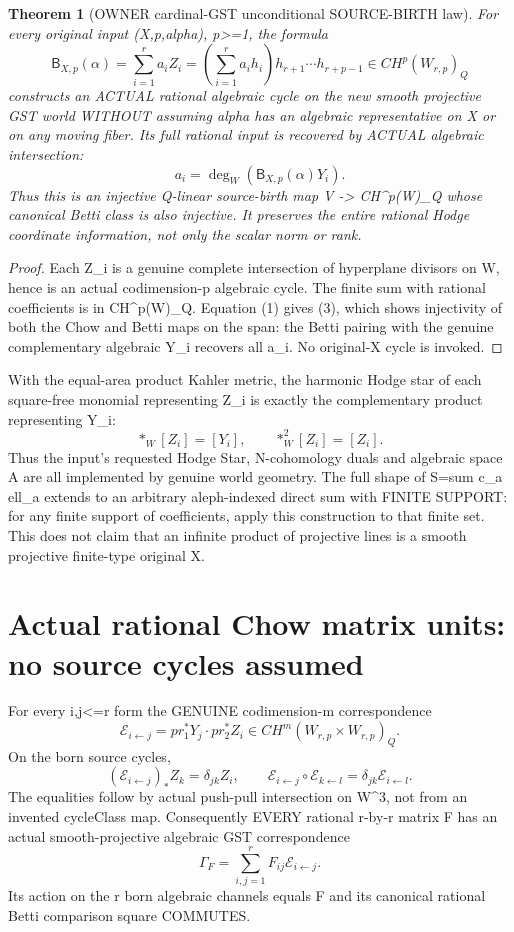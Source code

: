 \documentclass[11pt]{article}
\newtheorem{theorem}{Theorem}
\begin{document}
\begin{theorem}[OWNER cardinal-GST unconditional SOURCE-BIRTH law]
For every original input (X,p,alpha), p>=1, the formula
\[
\boxed{\mathsf B_{X,p}(\alpha)
=\sum_{i=1}^{r}a_i Z_i
=\left(\sum_{i=1}^{r}a_i h_i\right)
  h_{r+1}\cdots h_{r+p-1}
\in CH^p(W_{r,p})_Q}\tag{2}
\]
constructs an ACTUAL rational algebraic cycle on the
new smooth projective GST world WITHOUT assuming
alpha has an algebraic representative on X or
on any moving fiber. Its full rational input
is recovered by ACTUAL algebraic intersection:
\[
\boxed{a_i=\deg_W(\mathsf B_{X,p}(\alpha)Y_i).}\tag{3}
\]
Thus this is an injective Q-linear source-birth
map V -> CH^p(W)_Q whose canonical Betti
class is also injective. It preserves the
entire rational Hodge coordinate information,
not only the scalar norm or rank.
\end{theorem}
\begin{proof}
Each Z_i is a genuine complete intersection
of hyperplane divisors on W, hence is an actual
codimension-p algebraic cycle. The finite sum
with rational coefficients is in CH^p(W)_Q.
Equation (1) gives (3), which shows injectivity
of both the Chow and Betti maps on the span:
the Betti pairing with the genuine complementary
algebraic Y_i recovers all a_i.
No original-X cycle is invoked.
\end{proof}

With the equal-area product Kahler metric,
the harmonic Hodge star of each square-free
monomial representing Z_i is exactly the
complementary product representing Y_i:
\[
\boxed{*_W[Z_i]=[Y_i],\qquad *_W^2[Z_i]=[Z_i].}
\]
Thus the input's requested Hodge Star,
N-cohomology duals and algebraic space A
are all implemented by genuine world geometry.
The full shape of S=sum c_a ell_a extends to
an arbitrary aleph-indexed direct sum with
FINITE SUPPORT: for any finite support of
coefficients, apply this construction to that
finite set. This does not claim that an
infinite product of projective lines is a
smooth projective finite-type original X.

\section{Actual rational Chow matrix units: no source cycles assumed}
For every i,j<=r form the GENUINE codimension-m
correspondence
\[
\mathcal E_{i\leftarrow j}
=pr_1^*Y_j\cdot pr_2^*Z_i
\in CH^m(W_{r,p}\times W_{r,p})_Q.
\]
On the born source cycles,
\[
(\mathcal E_{i\leftarrow j})_* Z_k
=\delta_{jk}Z_i,\qquad
\mathcal E_{i\leftarrow j}\circ
\mathcal E_{k\leftarrow l}
=\delta_{jk}\mathcal E_{i\leftarrow l}.
\]
The equalities follow by actual push-pull
intersection on W^3, not from an
invented cycleClass map. Consequently
EVERY rational r-by-r matrix F has an
actual smooth-projective algebraic GST
correspondence
\[
\Gamma_F=\sum_{i,j=1}^rF_{ij}\mathcal E_{i\leftarrow j}.
\]
Its action on the r born algebraic
channels equals F and its canonical
rational Betti comparison square COMMUTES.
\end{document}
